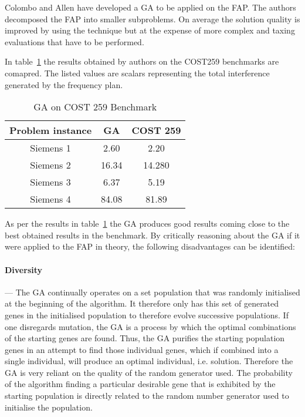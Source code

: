 Colombo and Allen\cite{ProblemDecompMIFAP} have developed a GA to be applied on the FAP. The authors decomposed the FAP into smaller subproblems. On average the solution quality is improved by using the technique but at the expense of more complex and taxing evaluations that have to be performed\cite{ProblemDecompMIFAP}. 

In table~\ref{tab:GA} the results obtained by authors on the COST259 benchmarks are comapred. The listed values are scalars representing the total interference generated by the frequency plan.
\begin{table}[H]
\centering
	\begin{tabular}{| c | c | c |}
	\hline
	Problem instance & GA & COST 259 \\ \hline
	Siemens 1 & 2.60 & 2.20 \\ \hline
	Siemens 2 & 16.34 & 14.280 \\ \hline
	Siemens 3 & 6.37 & 5.19 \\ \hline
	Siemens 4 & 84.08 & 81.89 \\ \hline
	\end{tabular}
\caption{GA on COST 259 Benchmark}
\label{tab:GA}
\end{table}

As per the results in table~\ref{tab:GA} the GA produces good results coming close to the best obtained results in the benchmark. By critically reasoning about the GA if it were applied to the FAP in theory, the following disadvantages can be identified:

\paragraph{Diversity}
--- The GA continually operates on a set population that was randomly initialised at the beginning of the algorithm. It therefore only has this set of generated genes in the initialised population to therefore evolve successive populations.
If one disregards mutation, the GA is a process by which the optimal combinations of the starting genes are found. Thus, the GA purifies the starting population genes in an attempt to find those individual genes, which if combined into a single individual, will produce an optimal individual, i.e. solution. Therefore the GA is very reliant on the quality of the random generator used. The probability of the algorithm finding a particular desirable gene that is exhibited by the starting population is directly related to the random number generator used to initialise the population. 
